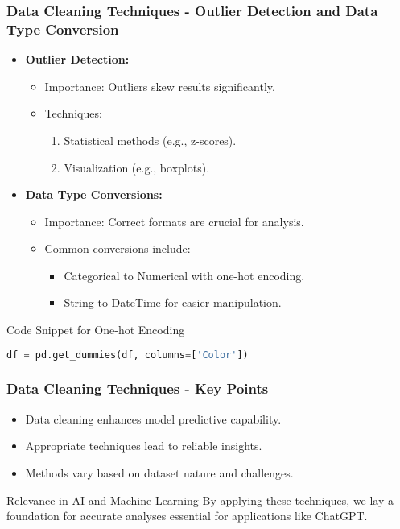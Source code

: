 \documentclass[aspectratio=169]{beamer}
\begin{document}
\begin{frame}[fragile]
    \frametitle{Data Cleaning Techniques - Outlier Detection and Data Type Conversion}
    \begin{itemize}
        \item \textbf{Outlier Detection:}
            \begin{itemize}
                \item Importance: Outliers skew results significantly.
                \item Techniques:
                    \begin{enumerate}
                        \item Statistical methods (e.g., z-scores).
                        \item Visualization (e.g., boxplots).
                    \end{enumerate}
                \end{itemize}
                \item \textbf{Data Type Conversions:}
                \begin{itemize}
                    \item Importance: Correct formats are crucial for analysis.
                    \item Common conversions include:
                    \begin{itemize}
                        \item Categorical to Numerical with one-hot encoding.
                        \item String to DateTime for easier manipulation.
                    \end{itemize}
                \end{itemize}    
        \end{itemize}
        \begin{block}{Code Snippet for One-hot Encoding}
            \begin{lstlisting}[language=Python]
df = pd.get_dummies(df, columns=['Color'])
            \end{lstlisting}
        \end{block}
    \end{frame}

\begin{frame}[fragile]
    \frametitle{Data Cleaning Techniques - Key Points}
    \begin{itemize}
        \item Data cleaning enhances model predictive capability.
        \item Appropriate techniques lead to reliable insights.
        \item Methods vary based on dataset nature and challenges.
    \end{itemize}
    \begin{block}{Relevance in AI and Machine Learning}
        By applying these techniques, we lay a foundation for accurate analyses essential for applications like ChatGPT.
    \end{block}
\end{frame}
\end{document}
